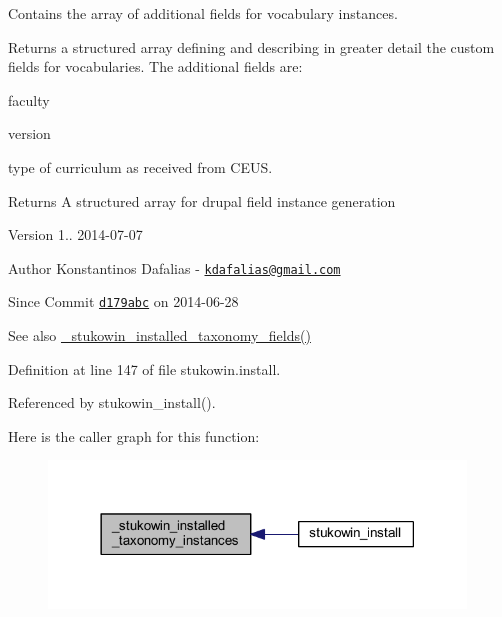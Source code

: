 Contains the array of additional fields for vocabulary instances. 

Returns a structured array defining and describing in greater detail the custom fields for vocabularies. The additional fields are\+:
\begin{DoxyItemize}
\item faculty
\item version
\item type of curriculum as received from C\+E\+U\+S.
\end{DoxyItemize}

\begin{DoxyReturn}{Returns}
A structured array for drupal field instance generation
\end{DoxyReturn}
\begin{DoxyVersion}{Version}
1.. 2014-\/07-\/07 
\end{DoxyVersion}
\begin{DoxyAuthor}{Author}
Konstantinos Dafalias -\/ \href{mailto:kdafalias@gmail.com}{\tt kdafalias@gmail.\+com} 
\end{DoxyAuthor}
\begin{DoxySince}{Since}
Commit \href{http://github.com/TheJake123/DrupalModul/commit/d179abcc5e05743086cd67cf1ce30b08923a7183}{\tt d179abc} on 2014-\/06-\/28
\end{DoxySince}
\begin{DoxySeeAlso}{See also}
\hyperlink{group___stukowin___module_ga0dbd0252e3db9efdb3cfefbefecf3d2e}{\+\_\+stukowin\+\_\+installed\+\_\+taxonomy\+\_\+fields()} 
\end{DoxySeeAlso}


Definition at line 147 of file stukowin.\+install.



Referenced by stukowin\+\_\+install().



Here is the caller graph for this function\+:
\nopagebreak
\begin{figure}[H]
\begin{center}
\leavevmode
\includegraphics[width=314pt]{group___stukowin___module_gafd634a2fb5766e1053fa7df79ab11c79_icgraph}
\end{center}
\end{figure}


